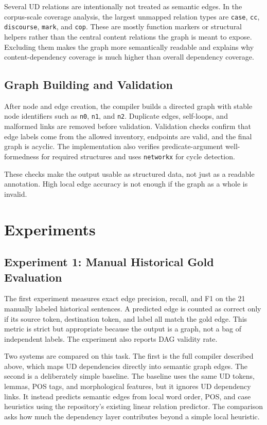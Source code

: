 \documentclass[11pt]{article}
\begin{document}
Several UD relations are intentionally not treated as semantic edges. In the
corpus-scale coverage analysis, the largest unmapped relation types are
\texttt{case}, \texttt{cc}, \texttt{discourse}, \texttt{mark}, and \texttt{cop}.
These are mostly function markers or structural helpers rather than the central
content relations the graph is meant to expose. Excluding them makes the graph
more semantically readable and explains why content-dependency coverage is much
higher than overall dependency coverage.

\subsection{Graph Building and Validation}
After node and edge creation, the compiler builds a directed graph with stable
node identifiers such as \texttt{n0}, \texttt{n1}, and \texttt{n2}. Duplicate
edges, self-loops, and malformed links are removed before validation. Validation
checks confirm that edge labels come from the allowed inventory, endpoints are
valid, and the final graph is acyclic. The implementation also verifies
predicate-argument well-formedness for required structures and uses
\texttt{networkx} for cycle detection.

These checks make the output usable as structured data, not just as a readable
annotation. High local edge accuracy is not enough if the graph as a whole is
invalid.

\section{Experiments}
\subsection{Experiment 1: Manual Historical Gold Evaluation}
The first experiment measures exact edge precision, recall, and F1 on the 21
manually labeled historical sentences. A predicted edge is counted as correct
only if its source token, destination token, and label all match the gold edge.
This metric is strict but appropriate because the output is a graph, not a bag of
independent labels. The experiment also reports DAG validity rate.

Two systems are compared on this task. The first is the full compiler described
above, which maps UD dependencies directly into semantic graph edges. The second
is a deliberately simple baseline. The baseline uses the same UD tokens, lemmas,
POS tags, and morphological features, but it ignores UD dependency links. It
instead predicts semantic edges from local word order, POS, and case heuristics
using the repository's existing linear relation predictor. The comparison asks
how much the dependency layer contributes beyond a simple local heuristic.
\end{document}
